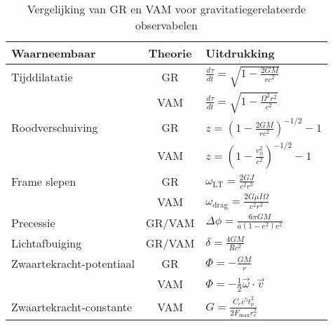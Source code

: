 \begin{table}[ht]
    \centering
    \caption{Vergelijking van GR en VAM voor gravitatiegerelateerde observabelen}
    \label{tab:VAM-GR}
    \begin{tabular}{|l|c|l|}
        \hline
        \textbf{Waarneembaar} & \textbf{Theorie} & \textbf{Uitdrukking} \\
        \hline
        Tijddilatatie & GR & $  \frac{d\tau}{dt} = \sqrt{1 - \frac{2GM}{rc^2}} $ \\
        & VAM & $  \frac{d\tau}{dt} = \sqrt{1 - \frac{\Omega^2 r^2}{c^2}} $ \\
        \hline
        Roodverschuiving & GR & $  z = \left(1 - \frac{2GM}{rc^2} \right)^{-1/2} - 1 $ \\
        & VAM & $  z = \left(1 - \frac{v_\phi^2}{c^2} \right)^{-1/2} - 1 $ \\
        \hline
        Frame slepen & GR & $  \omega_\text{LT} = \frac{2GJ}{c^2 r^3} $ \\
        & VAM & $  \omega_\text{drag} = \frac{2G \mu I \Omega}{c^2 r^3} $ \\
        \hline
        Precessie & GR/VAM & $  \Delta\phi = \frac{6\pi GM}{a(1 - e^2)c^2} $ \\
        \hline
        Lichtafbuiging & GR/VAM & $  \delta = \frac{4GM}{Rc^2} $ \\
        \hline
        Zwaartekracht-potentiaal & GR & $  \Phi = -\frac{GM}{r} $ \\
        & VAM & $  \Phi = -\frac{1}{2} \vec{\omega} \cdot \vec{v} $ \\
        \hline
        Zwaartekracht-constante & VAM & $  G = \frac{C_e c^5 t_p^2}{2 F_{\max} r_c^2} $ \\
        \hline
    \end{tabular}
\end{table}

